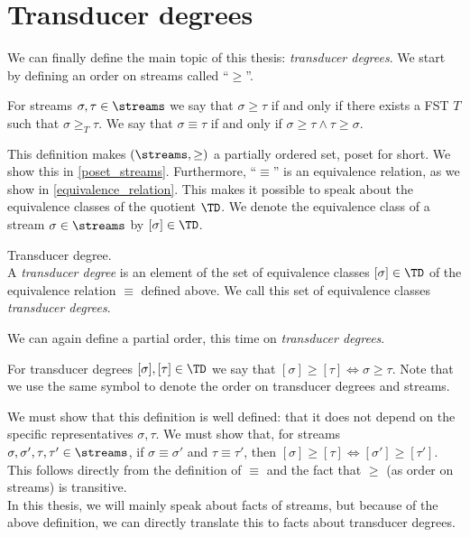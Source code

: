 \section{Transducer degrees}
We can finally define the main topic of this thesis: \textit{transducer degrees}. We start by defining an order on streams called ``$\geq$''.

\begin{definition}\label{def_geq_equiv}
	For streams $\sigma,\tau\in\streams$ we say that $\sigma \geq \tau$ if and only if there exists a FST $T$ such that $\sigma \geq_T \tau$.
	We say that $\sigma \equiv \tau$ if and only if $\sigma \geq \tau \land \tau \geq \sigma$.
\end{definition}

This definition makes $(\streams, \geq)$ a partially ordered set, poset for short. We show this in \cref{poset_streams}. Furthermore, ``$\equiv$'' is an equivalence relation, as we show in \cref{equivalence_relation}. This makes it possible to speak about the equivalence classes of the quotient $\TD$. We denote the equivalence class of a stream $\sigma\in\streams$ by $[\sigma]\in\TD$.

\begin{definition}{Transducer degree.}\\
	A \textit{transducer degree} is an element of the set of equivalence classes $[\sigma] \in \TD$ of the equivalence relation $\equiv$ defined above. We call this set of equivalence classes \textit{transducer degrees}.
\end{definition}

We can again define a partial order, this time on \textit{transducer degrees}. 

\begin{definition}\label{order_on_td}
	For transducer degrees $[\sigma],[\tau]\in\TD$ we say that $[\sigma] \geq [\tau] \iff \sigma \geq \tau$. Note that we use the same symbol to denote the order on transducer degrees and streams. 
\end{definition}

We must show that this definition is well defined: that it does not depend on the specific representatives $\sigma,\tau$. We must show that, for streams $\sigma,\sigma',\tau,\tau'\in\streams$, if $\sigma \equiv \sigma'$ and $\tau \equiv \tau'$, then $[\sigma] \geq [\tau] \iff [\sigma'] \geq [\tau']$. This follows directly from the definition of $\equiv$ and the fact that $\geq$ (as order on streams) is transitive.
\\
In this thesis, we will mainly speak about facts of streams, but because of the above definition, we can directly translate this to facts about transducer degrees. 